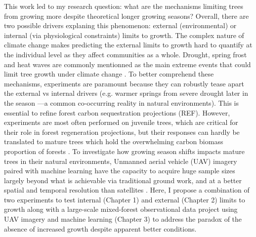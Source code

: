 \documentclass[12pt]{article}
\begin{document}
This work led to my research question: what are the mechanisms limiting trees from growing more despite theoretical longer growing seasons? Overall, there are two possible drivers explaning this phenomenon: external (environmental) \citep{kolar_response_2016} or internal (via physiological constraints)\citep{zohner_effect_2023} limits to growth. The complex nature of climate change makes predicting the external limits to growth hard to quantify at the individual level as they affect communities as a whole. Drought, spring frost and heat waves are commonly mentionned as the main extreme events that could limit tree growth under climate change \citep{drobyshev_influence_2008}. To better comprehend these mechanisms, experiments are paramount because they can robustly tease apart the external vs internal drivers (e.g. warmer springs from severe drought later in the season ---a common co-occurring reality in natural environments). This is essential to refine forest carbon sequestration projections (REF). However, experiments are most often performed on juvenile trees, which are critical for their role in forest regeneration projections, but their responses can hardly be translated to mature trees which hold the overwhelming carbon biomass proportion of forests \citep{augspurger_differences_2003,silvestro_longer_2023,vitasse_ontogenic_2013}. To investigate how growing season shifts impacts mature trees in their natural environments, Unmanned aerial vehicle (UAV) imagery paired with machine learning have the capacity to acquire huge sample sizes largely beyond what is achievable via traditional ground work, and at a better spatial and temporal resolution than satellites \citep{berra_assessing_2019,piao_plant_2019,teng_bringing_2025}. Here, I propose a combination of two experiments to test internal (Chapter 1) and external (Chapter 2) limits to growth along with a large-scale mixed-forest observational data project using UAV imagery and machine learning (Chapter 3) to address the paradox of the absence of increased growth despite apparent better conditions. \\
\end{document}
